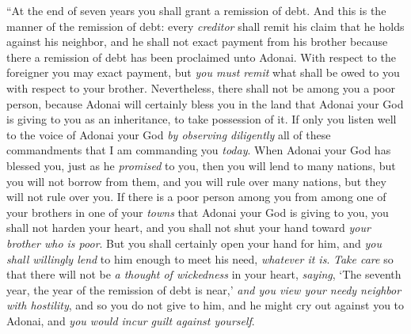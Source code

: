 \begin{biblechapter} %
\verse “At the end of seven years you shall grant a remission of debt.
\verse And this is the manner of the remission of debt: every \textit{creditor} shall remit his claim that he holds against his neighbor, and he shall not exact payment from his brother because there a remission of debt has been proclaimed unto Adonai.
\verse With respect to the foreigner you may exact payment, but \textit{you must remit} what shall be owed to you with respect to your brother.
\verse Nevertheless, there shall not be among you a poor person, because Adonai will certainly bless you in the land that Adonai your God is giving to you as an inheritance, to take possession of it.
\verse If only you listen well to the voice of Adonai your God \textit{by observing diligently} all of these commandments that I am commanding you \textit{today}.
\verse When Adonai your God has blessed you, just as he \textit{promised} to you, then you will lend to many nations, but you will not borrow from them, and you will rule over many nations, but they will not rule over you.
\verse If there is a poor person among you from among one of your brothers in one of your \textit{towns} that Adonai your God is giving to you, you shall not harden your heart, and you shall not shut your hand toward \textit{your brother who is poor}.
\verse But you shall certainly open your hand for him, and \textit{you shall willingly lend} to him enough to meet his need, \textit{whatever it is}.
\verse \textit{Take care} so that there will not be \textit{a thought of wickedness} in your heart, \textit{saying}, ‘The seventh year, the year of the remission of debt is near,’ \textit{and you view your needy neighbor with hostility}, and so you do not give to him, and he might cry out against you to Adonai, and \textit{you would incur guilt against yourself}.

\end{biblechapter}
